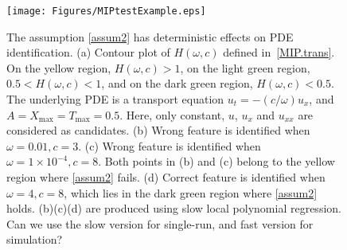 \documentclass[a4paper,11pt]{article}
\begin{document}
\begin{figure}
\centering
\texttt{[image: Figures/MIPtestExample.eps]}
\caption{The assumption \eqref{assum2} has deterministic effects on PDE identification. (a) Contour plot of $H(\omega,c)$ defined in~\eqref{MIP.trans}. On the yellow region, $H(\omega,c)>1$, on the light green region,  $0.5<H(\omega,c)<1$, and on the dark green region, $H(\omega,c)<0.5$. The underlying PDE is a transport equation $u_t=-(c/\omega)u_x$, and $A=X_{\max}=T_{\max}=0.5$. Here, only constant, $u$, $u_x$ and $u_{xx}$ are considered as candidates.  (b) Wrong feature is identified when $\omega=0.01,c=3$.  (c) Wrong feature is identified when $\omega=1\times10^{-4},c=8$. Both points in (b) and (c) belong to the yellow region where \eqref{assum2} fails. (d) Correct feature is identified when $\omega=4,c=8$, which lies in the dark green region where \eqref{assum2} holds. {\color{red} (b)(c)(d) are produced using slow  local polynomial regression. Can we use the slow version for single-run, and fast version for simulation?}}	\label{MIPtestExample}
\end{figure}
\end{document}
